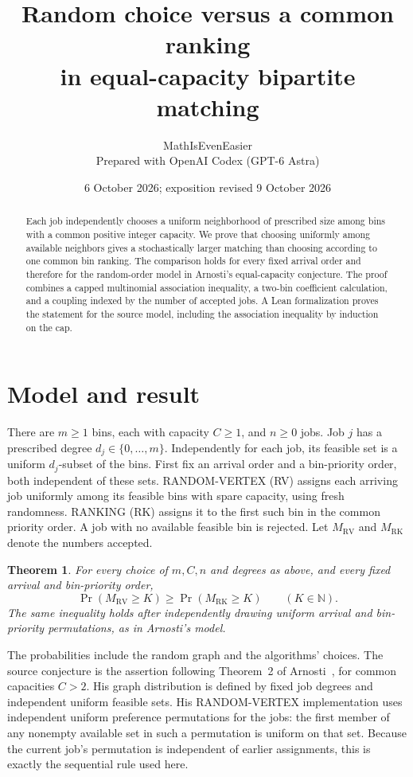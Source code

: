 \documentclass[11pt]{article}
\title{Random choice versus a common ranking\\in equal-capacity bipartite matching}
\author{MathIsEvenEasier\\\small Prepared with OpenAI Codex (GPT-6 Astra)}
\date{6 October 2026; exposition revised 9 October 2026}
\newtheorem{theorem}{Theorem}
\newcommand{\RV}{\mathrm{RV}}
\newcommand{\RK}{\mathrm{RK}}
\begin{document}
\maketitle

\begin{abstract}
Each job independently chooses a uniform neighborhood of prescribed size
among bins with a common positive integer capacity. We prove that choosing
uniformly among available neighbors gives a stochastically larger matching
than choosing according to one common bin ranking. The comparison holds
for every fixed arrival order and therefore for the random-order model
in Arnosti's equal-capacity conjecture. The proof combines a capped
multinomial association inequality, a two-bin coefficient calculation,
and a coupling indexed by the number of accepted jobs. A Lean formalization
proves the statement for the source model, including the association
inequality by induction on the cap.
\end{abstract}

\section{Model and result}\label{sec:model}
There are $m\geq1$ bins, each with capacity $C\geq1$, and $n\geq0$
jobs. Job $j$ has a prescribed degree $d_j\in\{0,\ldots,m\}$.
Independently for each job, its feasible set is a uniform $d_j$-subset of
the bins. First fix an arrival order and a bin-priority order, both
independent of these sets. RANDOM-VERTEX (RV) assigns each arriving job
uniformly among its feasible bins with spare capacity, using fresh
randomness. RANKING (RK) assigns it to the first such bin in the common
priority order. A job with no available feasible bin is rejected.
Let $M_{\RV}$ and $M_{\RK}$ denote the numbers accepted.

\begin{theorem}\label{thm:fullconjecture}
For every choice of $m,C,n$ and degrees as above, and every fixed arrival
and bin-priority order,
\begin{equation}\label{eq:main}
 \Pr(M_{\RV}\geq K)\geq\Pr(M_{\RK}\geq K)
 \qquad(K\in\mathbb N).
\end{equation}
The same inequality holds after independently drawing uniform arrival
and bin-priority permutations, as in Arnosti's model.
\end{theorem}

The probabilities include the random graph and the algorithms' choices.
The source conjecture is the assertion following Theorem~2 of
Arnosti~\cite{arnosti}, for common capacities $C>2$. His graph distribution
is defined by fixed job degrees and independent uniform feasible sets.
His RANDOM-VERTEX implementation uses independent uniform preference
permutations for the jobs: the first member of any nonempty available
set in such a permutation is uniform on that set. Because the current
job's permutation is independent of earlier assignments, this is exactly
the sequential rule used here.
\end{document}
